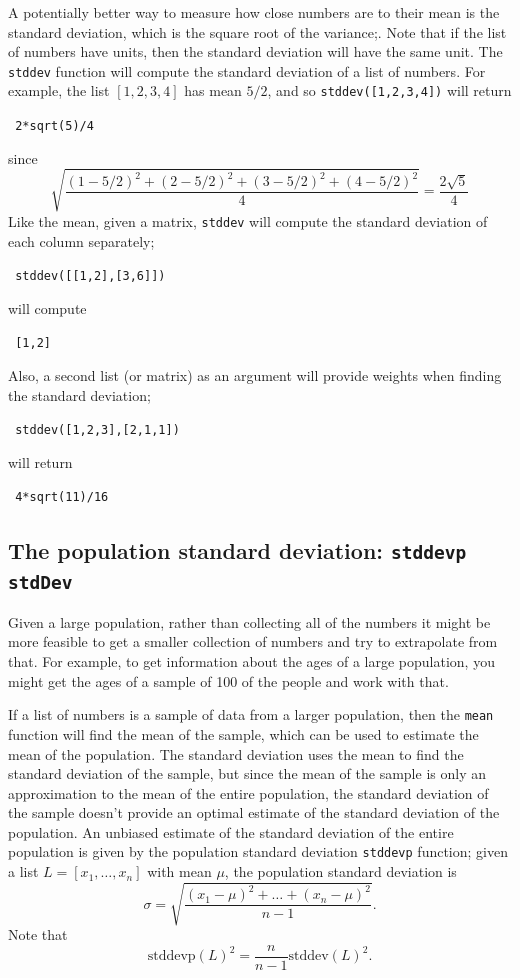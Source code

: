 \documentclass[a4paper,11pt]{book}
\begin{document}
A potentially better way to measure how close numbers are to their
mean is the standard deviation, which is the square root of the
variance;.  Note that if the list of numbers have units, then the
standard deviation will have the same unit.
The \texttt{stddev} function will compute the standard
deviation of a list of numbers.  For example, 
the list $[1,2,3,4]$ has mean $5/2$, and so 
\texttt{stddev([1,2,3,4])}
will return
\begin{center}
  \tt
  2*sqrt(5)/4
\end{center}
since
\[ \sqrt{\frac{(1-5/2)^2 + (2-5/2)^2 + (3-5/2)^2 + (4-5/2)^2}{4}} =
\frac{2\sqrt{5}}{4}
\]
Like the mean, given a matrix, \texttt{stddev} will compute the
standard deviation of each column separately;
\begin{center}
  \tt
  stddev([[1,2],[3,6]])
\end{center}
will compute
\begin{center}
  \tt
  [1,2]
\end{center}
Also, a second list (or matrix) as an argument will provide weights
when finding the standard deviation;
\begin{center}
  \tt
  stddev([1,2,3],[2,1,1])
\end{center}
will return
\begin{center}
  \tt
  4*sqrt(11)/16
\end{center}

\subsection{The population standard deviation: \texttt{stddevp} \texttt{stdDev}}

Given a large population, rather than collecting all of the numbers it
might be more feasible to get a smaller collection of numbers and try
to extrapolate from that.  For example, to get information about the
ages of a large population, you might get the ages of a sample of 100
of the people and work with that.

If a list of numbers is a sample of data from a larger population,
then the \texttt{mean} function will find the mean of the sample,
which can be used to estimate the mean of the population.  The
standard deviation uses the mean to find the standard
deviation of the sample, but since the mean of the sample is only an
approximation to the mean of the entire population, the standard
deviation of the sample doesn't provide an optimal estimate of
the standard deviation of the population.  An unbiased estimate of the
standard deviation of the entire population is given by the population
standard deviation \texttt{stddevp} function; 
given a list $L = [x_1,\dots,x_n]$ with mean $\mu$, the population
standard deviation is 
\[
\sigma = \sqrt{\frac{(x_1 - \mu)^2 + \dots + (x_n - \mu)^2}{n-1}}.
\]
Note that
\[ \text{stddevp}(L)^2 = \frac{n}{n-1} \text{stddev}(L)^2.\]
\end{document}
